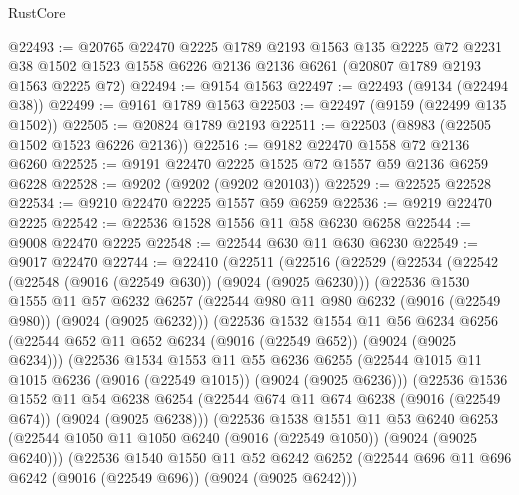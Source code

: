 \begin{lexlean}{RustCore}
\begin{coremodule}
@22493 := @20765
    @22470
    @2225
    @1789
    @2193
    @1563
    @135
    @2225
    @72
    @2231
    @38
    @1502
    @1523
    @1558
    @6226
    @2136
    @2136
    @6261
    (@20807 @1789 @2193 @1563 @2225 @72)
@22494 := @9154 @1563
@22497 := @22493 (@9134 (@22494 @38))
@22499 := @9161 @1789 @1563
@22503 := @22497 (@9159 (@22499 @135 @1502))
@22505 := @20824 @1789 @2193
@22511 := @22503 (@8983 (@22505 @1502 @1523 @6226 @2136))
@22516 := @9182 @22470 @1558 @72 @2136 @6260
@22525 := @9191 @22470 @2225 @1525 @72 @1557 @59 @2136 @6259 @6228
@22528 := @9202 (@9202 (@9202 @20103))
@22529 := @22525 @22528
@22534 := @9210 @22470 @2225 @1557 @59 @6259
@22536 := @9219 @22470 @2225
@22542 := @22536 @1528 @1556 @11 @58 @6230 @6258
@22544 := @9008 @22470 @2225
@22548 := @22544 @630 @11 @630 @6230
@22549 := @9017 @22470
@22744 := @22410
    (@22511
      (@22516
        (@22529
          (@22534
            (@22542
              (@22548 (@9016 (@22549 @630)) (@9024 (@9025 @6230)))
              (@22536
                @1530
                @1555
                @11
                @57
                @6232
                @6257
                (@22544 @980 @11 @980 @6232 (@9016 (@22549 @980)) (@9024 (@9025 @6232)))
                (@22536
                  @1532
                  @1554
                  @11
                  @56
                  @6234
                  @6256
                  (@22544 @652 @11 @652 @6234 (@9016 (@22549 @652)) (@9024 (@9025 @6234)))
                  (@22536
                    @1534
                    @1553
                    @11
                    @55
                    @6236
                    @6255
                    (@22544 @1015 @11 @1015 @6236 (@9016 (@22549 @1015)) (@9024 (@9025 @6236)))
                    (@22536
                      @1536
                      @1552
                      @11
                      @54
                      @6238
                      @6254
                      (@22544 @674 @11 @674 @6238 (@9016 (@22549 @674)) (@9024 (@9025 @6238)))
                      (@22536
                        @1538
                        @1551
                        @11
                        @53
                        @6240
                        @6253
                        (@22544 @1050 @11 @1050 @6240 (@9016 (@22549 @1050)) (@9024 (@9025 @6240)))
                        (@22536
                          @1540
                          @1550
                          @11
                          @52
                          @6242
                          @6252
                          (@22544 @696 @11 @696 @6242 (@9016 (@22549 @696)) (@9024 (@9025 @6242)))

\end{coremodule}
\end{lexlean}
